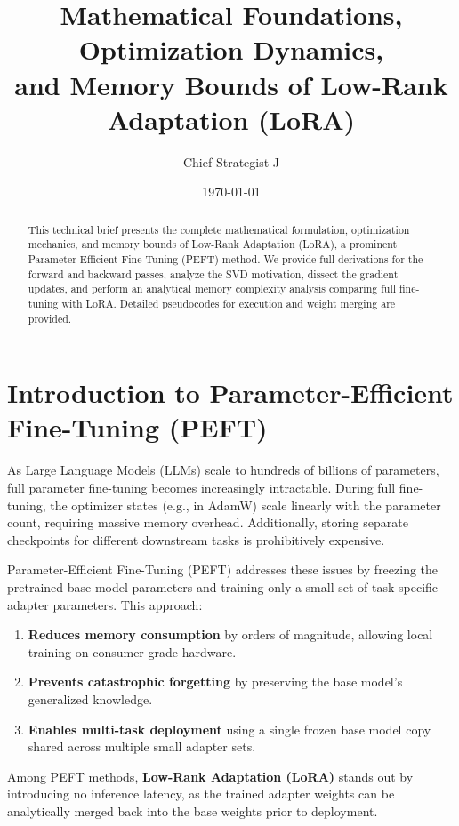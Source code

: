 \documentclass{article}
\title{\textbf{Mathematical Foundations, Optimization Dynamics,\\
and Memory Bounds of Low-Rank Adaptation (LoRA)}}
\author{Chief Strategist J}
\date{\today}
\begin{document}
\maketitle

\begin{abstract}
This technical brief presents the complete mathematical formulation, optimization mechanics, and memory bounds of Low-Rank Adaptation (LoRA), a prominent Parameter-Efficient Fine-Tuning (PEFT) method. We provide full derivations for the forward and backward passes, analyze the SVD motivation, dissect the gradient updates, and perform an analytical memory complexity analysis comparing full fine-tuning with LoRA. Detailed pseudocodes for execution and weight merging are provided.
\end{abstract}

\tableofcontents
\newpage

\section{Introduction to Parameter-Efficient Fine-Tuning (PEFT)}
As Large Language Models (LLMs) scale to hundreds of billions of parameters, full parameter fine-tuning becomes increasingly intractable. During full fine-tuning, the optimizer states (e.g., in AdamW) scale linearly with the parameter count, requiring massive memory overhead. Additionally, storing separate checkpoints for different downstream tasks is prohibitively expensive.

Parameter-Efficient Fine-Tuning (PEFT) addresses these issues by freezing the pretrained base model parameters and training only a small set of task-specific adapter parameters. This approach:
\begin{enumerate}
  \item \textbf{Reduces memory consumption} by orders of magnitude, allowing local training on consumer-grade hardware.
  \item \textbf{Prevents catastrophic forgetting} by preserving the base model's generalized knowledge.
  \item \textbf{Enables multi-task deployment} using a single frozen base model copy shared across multiple small adapter sets.
\end{enumerate}

Among PEFT methods, \textbf{Low-Rank Adaptation (LoRA)} stands out by introducing no inference latency, as the trained adapter weights can be analytically merged back into the base weights prior to deployment.
\end{document}
